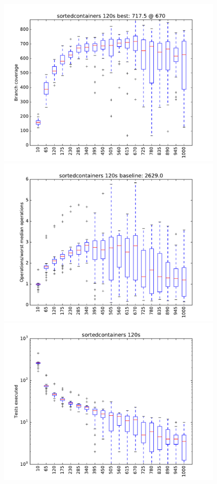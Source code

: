 \begin{figure}
\includegraphics[width=\columnwidth]{graphs/sortedcontainersrand120}
\includegraphics[width=\columnwidth]{graphs/opssortedcontainersrand120}
\includegraphics[width=\columnwidth]{graphs/execsortedcontainersrand120}
\end{figure}



